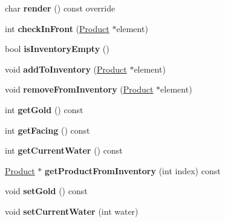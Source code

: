 \begin{DoxyCompactItemize}
\item 
\mbox{\label{class_player_a6daa4259fd7a2b382801f5e33e81960b}} 
char {\bfseries render} () const override
\item 
\mbox{\label{class_player_a3a62038ddc08dd5fe26dbd33a3b3fb71}} 
int {\bfseries check\+In\+Front} (\mbox{\hyperlink{class_product}{Product}} $\ast$element)
\item 
\mbox{\label{class_player_ab3c93d041cfa17ac2a10239979d9b1ca}} 
bool {\bfseries is\+Inventory\+Empty} ()
\item 
\mbox{\label{class_player_a4705a0783e10c3ca0e5d3c11e3d93f36}} 
void {\bfseries add\+To\+Inventory} (\mbox{\hyperlink{class_product}{Product}} $\ast$element)
\item 
\mbox{\label{class_player_a3244e8bdef443ebe88449b756df14bfe}} 
void {\bfseries remove\+From\+Inventory} (\mbox{\hyperlink{class_product}{Product}} $\ast$element)
\item 
\mbox{\label{class_player_af8eaab3b610debd175d424823e4af144}} 
int {\bfseries get\+Gold} () const
\item 
\mbox{\label{class_player_ac72a41034f2f445de714af0adf6f258b}} 
int {\bfseries get\+Facing} () const
\item 
\mbox{\label{class_player_a8cc8f60daa06748d93b403b93e887082}} 
int {\bfseries get\+Current\+Water} () const
\item 
\mbox{\label{class_player_a19bcee8132343b53a96872e6859747c0}} 
\mbox{\hyperlink{class_product}{Product}} $\ast$ {\bfseries get\+Product\+From\+Inventory} (int index) const
\item 
\mbox{\label{class_player_a56ef7ff2a7c93abce4ccc651c415ded8}} 
void {\bfseries set\+Gold} () const
\item 
\mbox{\label{class_player_a3f2c01ca65976b3a3304dfcc4fcd8e87}} 
void {\bfseries set\+Current\+Water} (int water)

\end{DoxyCompactItemize}

